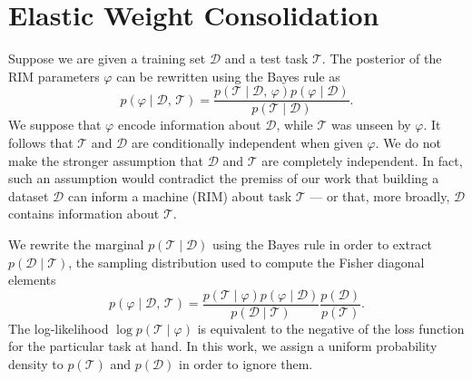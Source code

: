 \chapter{Elastic Weight Consolidation}\label{ap:ewc}

Suppose we are given a training set $\mathcal{D}$ and a test task $\mathcal{T}$. The 
posterior of the RIM parameters $\mathcal{\varphi}$ can be rewritten using the Bayes rule as
\begin{equation}
        p(\varphi \mid \mathcal{D},\, \mathcal{T}) = 
        \frac{p(\mathcal{T} \mid \mathcal{D},\, \varphi) p(\varphi \mid \mathcal{D})}
        {p(\mathcal{T} \mid \mathcal{D})}.
\end{equation} 
We suppose that $\varphi$ encode 
information about $\mathcal{D}$, while $\mathcal{T}$ was unseen by $\varphi$. 
It follows that 
$\mathcal{T}$ and $\mathcal{D}$ are conditionally independent when given $\varphi$. 
We do not make the stronger assumption that $\mathcal{D}$ and $\mathcal{T}$ 
are completely independent. In fact, such an assumption 
would contradict the premiss of our work that building a 
dataset $\mathcal{D}$ can inform a machine (RIM) about
task $\mathcal{T}$ --- or that, more broadly, $\mathcal{D}$ 
contains information about $\mathcal{T}$.

We rewrite the marginal $p(\mathcal{T} \mid \mathcal{D})$ using the Bayes rule
in order to extract $p(\mathcal{D} \mid \mathcal{T})$, 
the sampling distribution used to compute the Fisher diagonal elements
\begin{equation}
        p(\varphi \mid \mathcal{D},\, \mathcal{T}) = 
\frac{p(\mathcal{T} \mid \varphi) p(\varphi \mid \mathcal{D})}
        {p(\mathcal{D} \mid \mathcal{T})}
        \frac{p(\mathcal{D})}{p(\mathcal{T})}.
\end{equation} 
The log-likelihood $\log p(\mathcal{T} \mid \varphi)$ is equivalent to 
the negative of the loss function for the particular task at hand.
In this work, we assign a uniform probability density to $p(\mathcal{T})$ and $p(\mathcal{D})$ 
in order to ignore them.

